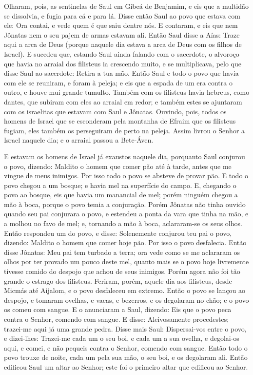 Olharam, pois, as sentinelas de Saul em Gibeá de Benjamim, e eis
que a multidão se dissolvia, e fugia para cá e para lá. Disse
então Saul ao povo que estava com ele: Ora contai, e vede quem é que
saiu dentre nós. E contaram, e eis que nem Jônatas nem o seu pajem
de armas estavam ali. Então Saul disse a Aías: Traze aqui a
arca de Deus (porque naquele dia estava a arca de Deus com os filhos
de Israel). E sucedeu que, estando Saul ainda falando com o
sacerdote, o alvoroço que havia no arraial dos filisteus ia
crescendo muito, e se multiplicava, pelo que disse Saul ao
sacerdote: Retira a tua mão. Então Saul e todo o povo que
havia com ele se reuniram, e foram à peleja; e eis que a espada de
um era contra o outro, e houve mui grande tumulto. Também com
os filisteus havia hebreus, como dantes, que subiram com eles ao
arraial em redor; e também estes se ajuntaram com os israelitas que
estavam com Saul e Jônatas. Ouvindo, pois, todos os homens de
Israel que se esconderam pela montanha de Efraim que os filisteus
fugiam, eles também os perseguiram de perto na peleja. Assim
livrou o Senhor a Israel naquele dia; e o arraial passou a
Bete-Áven.

E estavam os homens de Israel já exaustos naquele dia, porquanto
Saul conjurou o povo, dizendo: Maldito o homem que comer pão até à
tarde, antes que me vingue de meus inimigos. Por isso todo o povo se
absteve de provar pão. E todo o povo chegou a um bosque; e
havia mel na superfície do campo. E, chegando o povo ao
bosque, eis que havia um manancial de mel; porém ninguém chegou a
mão à boca, porque o povo temia a conjuração. Porém Jônatas
não tinha ouvido quando seu pai conjurara o povo, e estendeu a ponta
da vara que tinha na mão, e a molhou no favo de mel; e, tornando a
mão à boca, aclararam-se os seus olhos. Então respondeu um do
povo, e disse: Solenemente conjurou teu pai o povo, dizendo: Maldito
o homem que comer hoje pão. Por isso o povo desfalecia. Então
disse Jônatas: Meu pai tem turbado a terra; ora vede como se me
aclararam os olhos por ter provado um pouco deste mel, quanto
mais se o povo hoje livremente tivesse comido do despojo que achou
de seus inimigos. Porém agora não foi tão grande o estrago dos
filisteus. Feriram, porém, aquele dia aos filisteus, desde
Micmás até Aijalom, e o povo desfaleceu em extremo. Então o
povo se lançou ao despojo, e tomaram ovelhas, e vacas, e bezerros, e
os degolaram no chão; e o povo os comeu com sangue. E o
anunciaram a Saul, dizendo: Eis que o povo peca contra o Senhor,
comendo com sangue. E disse: Aleivosamente procedestes; trazei-me
aqui já uma grande pedra. Disse mais Saul: Dispersai-vos
entre o povo, e dizei-lhes: Trazei-me cada um o seu boi, e cada um a
sua ovelha, e degolai-os aqui, e comei, e não pequeis contra o
Senhor, comendo com sangue. Então todo o povo trouxe de noite, cada
um pela sua mão, o seu boi, e os degolaram ali. Então
edificou Saul um altar ao Senhor; este foi o primeiro altar que
edificou ao Senhor.

